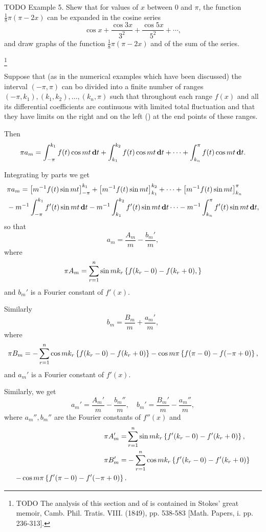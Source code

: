TODO Example 5. Shew that for values of $x$ between $0$ and $\pi$,
the function $\frac{1}{8} \pi (\pi - 2x)$ can
be expanded in the cosine series
$$
\cos x
+ \frac{\cos 3x}{3^{2}}
+ \frac{\cos 5x}{5^{2}}
+ \cdots,
$$
and draw graphs of the function $\frac{1}{8} \pi (\pi - 2x)$ and of the sum of the
series.

\footnote{TODO The analysis of this section and of  is contained in Stokes'
great memoir, Camb. Phil. Tratis. VIII. (1849), pp. 538-583 [Math.
Papers, i. pp. 236-313].}

Suppose that (as in the numerical examples which have been discussed)
the interval $(-\pi, \pi)$ can bo divided into a finite number of ranges
$(-\pi, k_{1}), (k_{1}, k_{2}), \ldots, (k_{n}, \pi)$
such that throughout each range $f(x)$
and all its differential coefficients are continuous with limited
total fluctuation and that they have limits on the right and on the
left () at the end points of these ranges.

Then
$$
\pi a_{m}
=
\int_{-\pi}^{k_{1}} f(t) \cos mt \, \mathbf{d} t
+ \int_{k_{1}}^{k_{2}} f(t) \cos mt \, \mathbf{d} t
+ \cdots
+ \int_{k_{n}}^{\pi} f(t) \cos mt \, \mathbf{d} t.
$$

Integrating by parts we get
\begin{align*}
  &
  \pi a_{m}
  =
  \thebracket{
    m^{-1} f(t) \sin mt
  }_{-\pi}^{k_{1}}
  +
  \thebracket{
    m^{-1} f(t) \sin mt
  }_{k_{1}}^{k_{2}}
  +
  \cdots
  +
  \thebracket{
    m^{-1} f(t) \sin mt
  }_{k_{n}}^{\pi}
  \\
  & \hfill
  - m^{-1} \int_{-\pi}^{k_{1}} f'(t) \sin mt \dmeasure t
  - m^{-1} \int_{k_{1}}^{k_{2}} f'(t) \sin mt \dmeasure t
  \cdots
  - m^{-1} \int_{k_{n}}^{\pi} f'(t) \sin mt \dmeasure t,
\end{align*}
so that
$$
a_{m} = \frac{A_{m}}{m} - \frac{b_{m}'}{m},
$$
%
%
where
$$
\pi A_{m}
=
\sum_{r=1}^{n}
\sin m k_{r}
\left\{ 
  f(k_{r} - 0) - f(k_{r} + 0),
 \right\}
$$
and $b_{m}'$ is a Fourier constant of $f'(x)$.

Similarly
$$
b_{m} = \frac{B_{m}}{m} + \frac{a_{m}'}{m},
$$
where
$$
\pi B_{m}
=
-
\sum_{r=1}^{n}
\cos m k_{r}
\left\{ 
  f(k_{r} - 0)
  -
  f(k_{r} + 0)
 \right\}
-
\cos m \pi
\left\{ 
  f(\pi - 0)
  -
  f(-\pi + 0)
 \right\}
,
$$
and $a_{m}'$ is a Fourier constant of $f'(x)$.

Similarly, we get
$$
a_{m}' = \frac{A_{m}'}{m} - \frac{b_{m}''}{m},
\quad
b_{m}' = \frac{B_{m}'}{m} - \frac{a_{m}''}{m},
$$
where $a_{m}'', b_{m}''$ are the Fourier constants of
$f''(x)$ and
\begin{align*}
  \pi A_{m}'
  =&
  \sum_{r=1}^{n} \sin m k_{r} \thebrace{
    f'(k_{r}-0) - f'(k_{r}+0)
  },
  \\
  \pi B_{m}'
  =&
  - \sum_{r=1}^{n} \cos m k_{r} \thebrace{
    f'(k_{r}-0) - f'(k_{r}+0)
  }
  \\
  \hfill
  - \cos m \pi \thebrace{
    f'(\pi - 0) - f'(-\pi + 0)
  }.
\end{align*}

